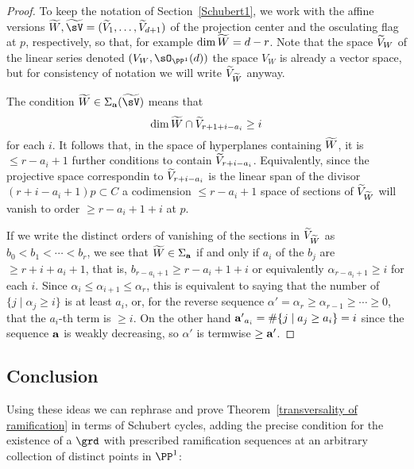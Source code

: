 %


\begin{proof}
To keep the notation of Section~\ref{Schubert1}, we work with the affine versions
$\tL, \tsV = (\tV_1, \dots, \tV_{d+1})$ of the projection center and the osculating flag at $p$, respectively,
so that, for example $\dim \tL = d-r$. Note that the space $\tV_W$ of the linear series 
denoted $(V_W, \sO_{\PP^1}(d))$ the space $V_W$
is already a vector space, but for consistency of notation we will write $\tV_\tL$ anyway.

The condition $\tL \in \Sigma_{\bf a}({\tsV})$
 means that 
$$
\dim \tL \cap \tV_{r+1+i-a_i} \geq i
$$
for each $i$. It follows that, 
in the space of hyperplanes containing $\tL$, it is $\leq r-a_i+1$ further conditions to contain $\tV_{r+i-a_i}$. Equivalently,
since the projective space correspondin to $\tV_{r+i-a_i}$ is the linear span of the divisor $(r+i-a_i+1)p\subset C$
a codimension $\leq r-a_i+1$ space of sections of $\tV_\tL$ will vanish to order $\geq r -a_i+1+i$ at $p$. 

If we write the distinct orders of vanishing of the sections in $\tV_\tL$ as
$b_0 < b_1<  \cdots < b_r$, we see that $\tL \in \Sigma_{\bf a}$  if and only if
$a_i$ of the $b_j$ are $\geq r+i+a_i+1$, that is,
$b_{r-a_i+1}\geq r-a_i+1+i$ or equivalently $\alpha_{r-a_i+1}\geq i$ for each $i$.
Since $\alpha_i\leq \alpha_{i+1} \leq \alpha_r$,
this is equivalent to saying that the number of $\{j \mid \alpha_j \geq i\}$ is at least $a_i$, or, for the
reverse sequence $\alpha' = \alpha_r \geq \alpha_{r-1} \geq \cdots \geq 0$, that the $a_i$-th term is $\geq i$.
On the other hand ${\bf a'}_{a_i} = \#\{j\mid a_j \geq a_i\} = i$ since the sequence ${\bf a}$ is weakly
decreasing, so $\alpha'$ is termwise $\geq {\bf a'}$.
\end{proof}

\subsection{Conclusion}

Using these ideas we  can rephrase and prove Theorem~\ref{transversality of ramification} in terms of Schubert cycles,
adding the precise condition for the existence of a $\grd$ with prescribed ramification sequences
at an arbitrary collection of distinct points in $\PP^{1}$:

